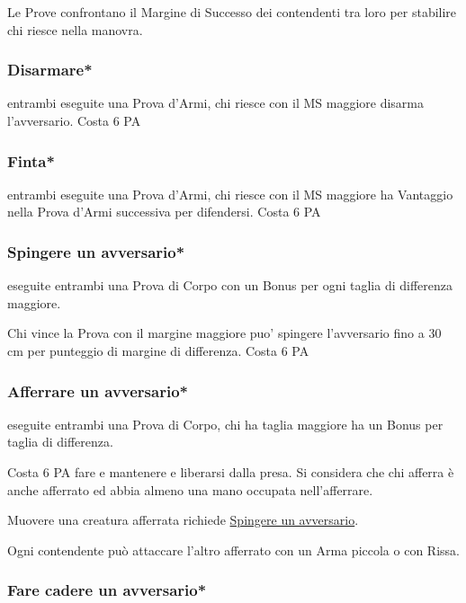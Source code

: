 \documentclass[12pt,a4paper,twoside,openany]{book}
\begin{document}
\begin{multicols}{2}
Le Prove confrontano il Margine di Successo dei contendenti tra loro per stabilire chi riesce nella manovra.

\subsubsection{Disarmare*}\label{disarmare}

entrambi eseguite una Prova d'Armi, chi riesce con il MS maggiore disarma l'avversario. Costa 6 PA

\subsubsection{Finta*} \label{finta}

entrambi eseguite una Prova d'Armi, chi riesce con il MS maggiore ha Vantaggio nella Prova d'Armi successiva per difendersi. Costa 6 PA

\subsubsection{Spingere un avversario*} \label{spingereavversario}\hypertarget{spingereavversario}{}

eseguite entrambi una Prova di Corpo con un Bonus per ogni taglia di differenza maggiore.

Chi vince la Prova con il margine maggiore puo' spingere l'avversario fino a 30 cm per punteggio di margine di differenza. Costa 6 PA

\subsubsection{Afferrare un avversario*}\label{afferrareunavversario}

eseguite entrambi una Prova di Corpo, chi ha taglia maggiore ha un Bonus per taglia di differenza.

Costa 6 PA fare e mantenere e liberarsi dalla presa. Si considera che chi afferra è anche afferrato ed abbia almeno una mano occupata nell'afferrare.

Muovere una creatura afferrata richiede \hyperlink{spingereavversario}{Spingere un avversario}.

Ogni contendente può attaccare l'altro afferrato con un Arma piccola o con Rissa.

\subsubsection{Fare cadere un avversario*} \label{farecadereavversario}


\end{multicols}
\end{document}
